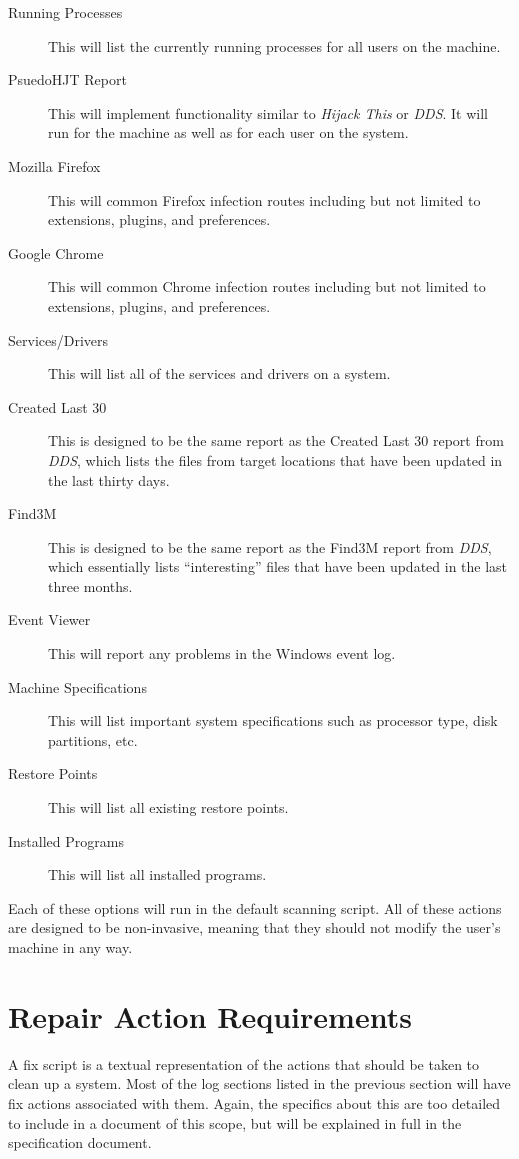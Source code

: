 \documentclass[letterpaper,12pt]{article}
\begin{document}
\begin{description}
    \item[Running Processes] This will list the currently running processes for
    all users on the machine.
    \item[PsuedoHJT Report] This will implement functionality similar to
    \textit{Hijack This} or \textit{DDS}.  It will run for the machine as well
    as for each user on the system.
    \item[Mozilla Firefox] This will common Firefox infection routes including
    but not limited to extensions, plugins, and preferences.
    \item[Google Chrome] This will common Chrome infection routes including
    but not limited to extensions, plugins, and preferences.
    \item[Services/Drivers] This will list all of the services and drivers on a
    system.
    \item[Created Last 30] This is designed to be the same report as the Created
    Last 30 report from \textit{DDS}, which lists the files from target
    locations that have been updated in the last thirty days.
    \item[Find3M] This is designed to be the same report as the Find3M report
    from \textit{DDS}, which essentially lists ``interesting'' files that have
    been updated in the last three months.
    \item[Event Viewer] This will report any problems in the Windows event log.
    \item[Machine Specifications] This will list important system specifications
    such as processor type, disk partitions, etc.
    \item[Restore Points] This will list all existing restore points.
    \item[Installed Programs] This will list all installed programs.
\end{description}

Each of these options will run in the default scanning script.  All of these
actions are designed to be non-invasive, meaning that they should not modify the
user's machine in any way.  

\newpage



\section{Repair Action Requirements}
A fix script is a textual representation of the actions that should be taken to
clean up a system.  Most of the log sections listed in the previous section will
have fix actions associated with them.  Again, the specifics about this are too
detailed to include in a document of this scope, but will be explained in full
in the specification document.
\end{document}

